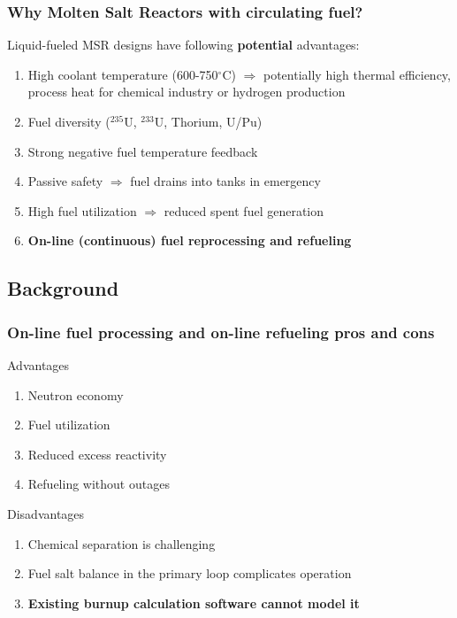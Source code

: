 \begin{frame}
\frametitle{Why Molten Salt Reactors with circulating fuel?}
\begin{block}{Liquid-fueled \gls{MSR} designs have following \textbf{potential} advantages:}
	\begin{enumerate}
		\itemsep1em
		\item High coolant temperature (600-750$^{\circ}$C) 
		$\Rightarrow$ potentially high thermal efficiency, process 
		heat for chemical industry or hydrogen production
		\item Fuel diversity ($^{235}$U, $^{233}$U, Thorium, U/Pu)
		\item Strong negative fuel temperature feedback 
		\item Passive safety $\Rightarrow$ fuel drains into tanks 
		in emergency
		\item High fuel utilization $\Rightarrow$ reduced spent fuel 
		generation
		\item<2> \textbf{On-line (continuous) fuel reprocessing and refueling}
	\end{enumerate}
\end{block}

\end{frame}


\subsection{Background}

\begin{frame}
\frametitle{On-line fuel processing and on-line refueling pros and 
cons}
\begin{block}{Advantages}
	\begin{enumerate}
		\item Neutron economy
		\item Fuel utilization
		\item Reduced excess reactivity
		\item Refueling without outages
	\end{enumerate}
\end{block}

\begin{block}{Disadvantages}
	\begin{enumerate}
		\item Chemical separation is challenging
		\item Fuel salt balance in the primary loop complicates operation
		\item \textbf{Existing burnup calculation software cannot model it}
	\end{enumerate}
\end{block}

\end{frame}


